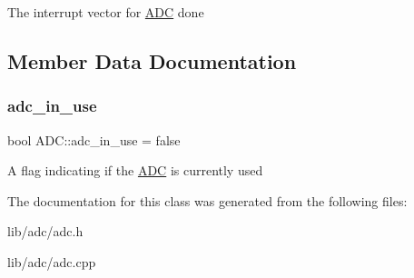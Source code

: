 The interrupt vector for \hyperlink{class_a_d_c}{A\+DC} done 

\subsection{Member Data Documentation}
\hypertarget{class_a_d_c_a861d0d9bd4dc73f9811c129548fb9a48}{}\label{class_a_d_c_a861d0d9bd4dc73f9811c129548fb9a48} 
\subsubsection{\texorpdfstring{adc\+\_\+in\+\_\+use}{adc\_in\_use}}
{\footnotesize\ttfamily bool A\+D\+C\+::adc\+\_\+in\+\_\+use = false\hspace{0.3cm}{\ttfamily [static]}}

A flag indicating if the \hyperlink{class_a_d_c}{A\+DC} is currently used 

The documentation for this class was generated from the following files\+:\begin{DoxyCompactItemize}
\item 
lib/adc/adc.\+h\item 
lib/adc/adc.\+cpp\end{DoxyCompactItemize}
